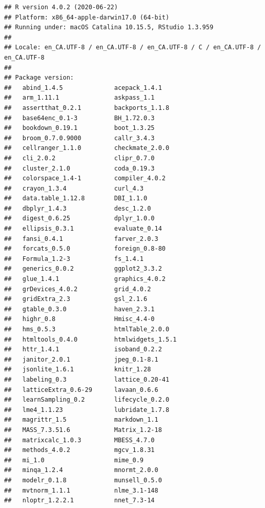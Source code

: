 \documentclass[
]{krantz}
\begin{document}
\begin{verbatim}
## R version 4.0.2 (2020-06-22)
## Platform: x86_64-apple-darwin17.0 (64-bit)
## Running under: macOS Catalina 10.15.5, RStudio 1.3.959
## 
## Locale: en_CA.UTF-8 / en_CA.UTF-8 / en_CA.UTF-8 / C / en_CA.UTF-8 / en_CA.UTF-8
## 
## Package version:
##   abind_1.4.5              acepack_1.4.1           
##   arm_1.11.1               askpass_1.1             
##   assertthat_0.2.1         backports_1.1.8         
##   base64enc_0.1-3          BH_1.72.0.3             
##   bookdown_0.19.1          boot_1.3.25             
##   broom_0.7.0.9000         callr_3.4.3             
##   cellranger_1.1.0         checkmate_2.0.0         
##   cli_2.0.2                clipr_0.7.0             
##   cluster_2.1.0            coda_0.19.3             
##   colorspace_1.4-1         compiler_4.0.2          
##   crayon_1.3.4             curl_4.3                
##   data.table_1.12.8        DBI_1.1.0               
##   dbplyr_1.4.3             desc_1.2.0              
##   digest_0.6.25            dplyr_1.0.0             
##   ellipsis_0.3.1           evaluate_0.14           
##   fansi_0.4.1              farver_2.0.3            
##   forcats_0.5.0            foreign_0.8-80          
##   Formula_1.2-3            fs_1.4.1                
##   generics_0.0.2           ggplot2_3.3.2           
##   glue_1.4.1               graphics_4.0.2          
##   grDevices_4.0.2          grid_4.0.2              
##   gridExtra_2.3            gsl_2.1.6               
##   gtable_0.3.0             haven_2.3.1             
##   highr_0.8                Hmisc_4.4-0             
##   hms_0.5.3                htmlTable_2.0.0         
##   htmltools_0.4.0          htmlwidgets_1.5.1       
##   httr_1.4.1               isoband_0.2.2           
##   janitor_2.0.1            jpeg_0.1-8.1            
##   jsonlite_1.6.1           knitr_1.28              
##   labeling_0.3             lattice_0.20-41         
##   latticeExtra_0.6-29      lavaan_0.6.6            
##   learnSampling_0.2        lifecycle_0.2.0         
##   lme4_1.1.23              lubridate_1.7.8         
##   magrittr_1.5             markdown_1.1            
##   MASS_7.3.51.6            Matrix_1.2-18           
##   matrixcalc_1.0.3         MBESS_4.7.0             
##   methods_4.0.2            mgcv_1.8.31             
##   mi_1.0                   mime_0.9                
##   minqa_1.2.4              mnormt_2.0.0            
##   modelr_0.1.8             munsell_0.5.0           
##   mvtnorm_1.1.1            nlme_3.1-148            
##   nloptr_1.2.2.1           nnet_7.3-14             

\end{verbatim}
\end{document}
